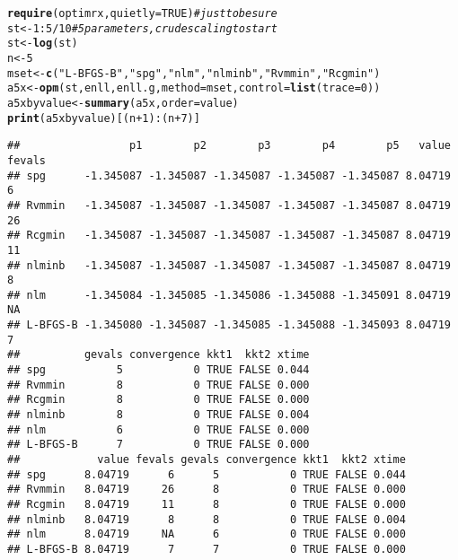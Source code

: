 \documentclass[11pt]{article}\usepackage[]{graphicx}\usepackage[]{color}
\makeatletter
\newcommand{\hlnum}[1]{\textcolor[rgb]{0.686,0.059,0.569}{#1}}%
\newcommand{\hlstr}[1]{\textcolor[rgb]{0.192,0.494,0.8}{#1}}%
\newcommand{\hlcom}[1]{\textcolor[rgb]{0.678,0.584,0.686}{\textit{#1}}}%
\newcommand{\hlopt}[1]{\textcolor[rgb]{0,0,0}{#1}}%
\newcommand{\hlstd}[1]{\textcolor[rgb]{0.345,0.345,0.345}{#1}}%
\newcommand{\hlkwb}[1]{\textcolor[rgb]{0.69,0.353,0.396}{#1}}%
\newcommand{\hlkwc}[1]{\textcolor[rgb]{0.333,0.667,0.333}{#1}}%
\newcommand{\hlkwd}[1]{\textcolor[rgb]{0.737,0.353,0.396}{\textbf{#1}}}%
\newenvironment{kframe}{%
 \def\at@end@of@kframe{}%
 \ifinner\ifhmode%
  \def\at@end@of@kframe{\end{minipage}}%
  \begin{minipage}{\columnwidth}%
 \fi\fi%
 \def\FrameCommand##1{\hskip\@totalleftmargin \hskip-\fboxsep
 \colorbox{shadecolor}{##1}\hskip-\fboxsep
     \hskip-\linewidth \hskip-\@totalleftmargin \hskip\columnwidth}%
 \MakeFramed {\advance\hsize-\width
   \@totalleftmargin\z@ \linewidth\hsize
   \@setminipage}}%
 {\par\unskip\endMakeFramed%
 \at@end@of@kframe}
\newenvironment{knitrout}{}{} %
\makeatother
\begin{document}
\begin{knitrout}\scriptsize
{}\color{fgcolor}\begin{kframe}
\begin{alltt}
\hlkwd{require}\hlstd{(optimrx,} \hlkwc{quietly}\hlstd{=}\hlnum{TRUE}\hlstd{)} \hlcom{# just to be sure}
\hlstd{st}\hlkwb{<-}\hlnum{1}\hlopt{:}\hlnum{5}\hlopt{/}\hlnum{10} \hlcom{# 5 parameters, crude scaling to start}
\hlstd{st}\hlkwb{<-}\hlkwd{log}\hlstd{(st)}
\hlstd{n} \hlkwb{<-} \hlnum{5}
\hlstd{mset}\hlkwb{<-}\hlkwd{c}\hlstd{(}\hlstr{"L-BFGS-B"}\hlstd{,} \hlstr{"spg"}\hlstd{,} \hlstr{"nlm"}\hlstd{,} \hlstr{"nlminb"}\hlstd{,} \hlstr{"Rvmmin"}\hlstd{,} \hlstr{"Rcgmin"}\hlstd{)}
\hlstd{a5x}\hlkwb{<-}\hlkwd{opm}\hlstd{(st, enll, enll.g,} \hlkwc{method}\hlstd{=mset,} \hlkwc{control}\hlstd{=}\hlkwd{list}\hlstd{(}\hlkwc{trace}\hlstd{=}\hlnum{0}\hlstd{))}
\hlstd{a5xbyvalue}\hlkwb{<-}\hlkwd{summary}\hlstd{(a5x,} \hlkwc{order}\hlstd{=value)}
\hlkwd{print}\hlstd{(a5xbyvalue)[(n}\hlopt{+}\hlnum{1}\hlstd{)}\hlopt{:}\hlstd{(n}\hlopt{+}\hlnum{7}\hlstd{)]}
\end{alltt}
\begin{verbatim}
##                 p1        p2        p3        p4        p5   value fevals
## spg      -1.345087 -1.345087 -1.345087 -1.345087 -1.345087 8.04719      6
## Rvmmin   -1.345087 -1.345087 -1.345087 -1.345087 -1.345087 8.04719     26
## Rcgmin   -1.345087 -1.345087 -1.345087 -1.345087 -1.345087 8.04719     11
## nlminb   -1.345087 -1.345087 -1.345087 -1.345087 -1.345087 8.04719      8
## nlm      -1.345084 -1.345085 -1.345086 -1.345088 -1.345091 8.04719     NA
## L-BFGS-B -1.345080 -1.345087 -1.345085 -1.345088 -1.345093 8.04719      7
##          gevals convergence kkt1  kkt2 xtime
## spg           5           0 TRUE FALSE 0.044
## Rvmmin        8           0 TRUE FALSE 0.000
## Rcgmin        8           0 TRUE FALSE 0.000
## nlminb        8           0 TRUE FALSE 0.004
## nlm           6           0 TRUE FALSE 0.000
## L-BFGS-B      7           0 TRUE FALSE 0.000
##            value fevals gevals convergence kkt1  kkt2 xtime
## spg      8.04719      6      5           0 TRUE FALSE 0.044
## Rvmmin   8.04719     26      8           0 TRUE FALSE 0.000
## Rcgmin   8.04719     11      8           0 TRUE FALSE 0.000
## nlminb   8.04719      8      8           0 TRUE FALSE 0.004
## nlm      8.04719     NA      6           0 TRUE FALSE 0.000
## L-BFGS-B 8.04719      7      7           0 TRUE FALSE 0.000
\end{verbatim}
\begin{alltt}

\end{alltt}
\end{kframe}
\end{knitrout}
\end{document}
